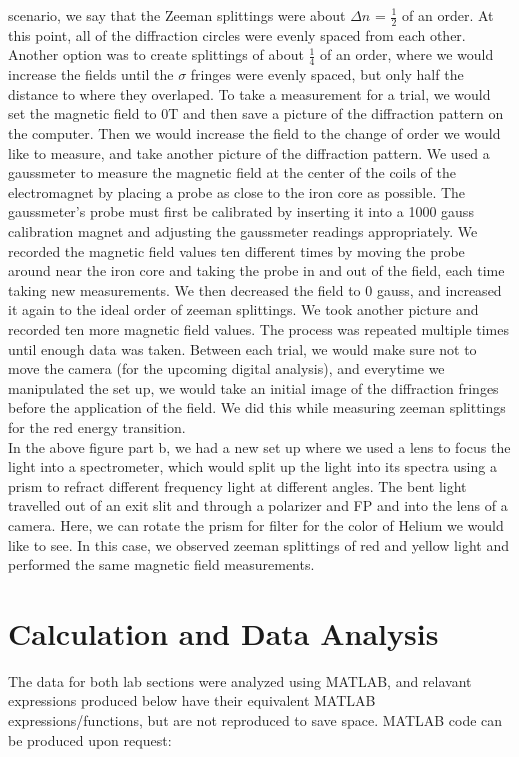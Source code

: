 \documentclass{article}
\begin{document}
scenario, we say that the Zeeman splittings were about $\Delta n$ = $\frac{1}{2}$ of an order. At this point, all of the diffraction circles were evenly spaced from each other. Another option was to create splittings of about $\frac{1}{4}$ of an order, where we would increase the fields until the $\sigma$ fringes were evenly spaced, but only half the distance to where they overlaped. To take a measurement for a trial, we would set the magnetic field to 0T and then save a picture of the diffraction pattern on the computer. Then we would increase the field to the change of order we would like to measure, and take another picture of the diffraction pattern. We used a gaussmeter to measure the magnetic field at the center of the coils of the electromagnet by placing a probe as close to the iron core as possible. The gaussmeter's probe must first be calibrated by inserting it into a 1000 gauss calibration magnet and adjusting the gaussmeter readings appropriately. We recorded the magnetic field values ten different times by moving the probe around near the iron core and taking the probe in and out of the field, each time taking new measurements. We then decreased the field to 0 gauss, and increased it again to the ideal order of zeeman splittings. We took another picture and recorded ten more magnetic field values. The process was repeated multiple times until enough data was taken. Between each trial, we would make sure not to move the camera (for the upcoming digital analysis), and everytime we manipulated the set up, we would take an initial image of the diffraction fringes before the application of the field. We did this while measuring zeeman splittings for the red energy transition.\\\indent In the above figure part b, we had a new set up where we used a lens to focus the light into a spectrometer, which would split up the light into its spectra using a prism to refract different frequency light at different angles. The bent light travelled out of an exit slit and through a polarizer and FP and into the lens of a camera. Here, we can rotate the prism for filter for the color of Helium we would like to see. In this case, we observed zeeman splittings of red and yellow light and performed the same magnetic field measurements. %
    

\section{Calculation and Data Analysis}
    The data for both lab sections were analyzed using MATLAB, and relavant expressions produced below have their equivalent MATLAB expressions/functions, but are not reproduced to save space. MATLAB code can be produced upon request:
\end{document}

